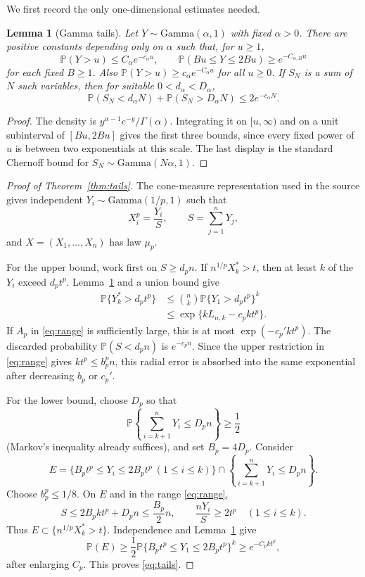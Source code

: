 \documentclass[11pt]{article}
\newtheorem{lemma}[theorem]{Lemma}
\newcommand{\Pp}{\mathbb P}
\begin{document}
We first record the only one-dimensional estimates needed.

\begin{lemma}[Gamma tails]\label{lem:gamma}
Let $Y\sim\mathrm{Gamma}(\alpha,1)$ with fixed $\alpha>0$.  There are positive
constants depending only on $\alpha$ such that, for $u\geq1$,
\[
 \Pp(Y>u)\leq C_\alpha e^{-c_\alpha u},
 \qquad
 \Pp(Bu\leq Y\leq2Bu)\geq e^{-C_{\alpha,B}u}
\]
for each fixed $B\geq1$.  Also
$\Pp(Y>u)\geq c_\alpha e^{-C_\alpha u}$ for all $u\geq0$.
If $S_N$ is a sum of $N$ such variables, then for suitable
$0<d_\alpha<D_\alpha$,
\[
 \Pp(S_N<d_\alpha N)+\Pp(S_N>D_\alpha N)\leq2e^{-c_\alpha N}.
\]
\end{lemma}

\begin{proof}
The density is $y^{\alpha-1}e^{-y}/\Gamma(\alpha)$.  Integrating it on
$[u,\infty)$ and on a unit subinterval of $[Bu,2Bu]$ gives the first three
bounds, since every fixed power of $u$ is between two exponentials at this
scale.  The last display is the standard Chernoff bound for
$S_N\sim\mathrm{Gamma}(N\alpha,1)$.
\end{proof}

\begin{proof}[Proof of Theorem~\ref{thm:tails}]
The cone-measure representation used in the source gives independent
$Y_i\sim\mathrm{Gamma}(1/p,1)$ such that
\begin{equation}\label{eq:representation}
 X_i^p=\frac{Y_i}{S},\qquad S=\sum_{j=1}^nY_j,
\end{equation}
and $X=(X_1,\ldots,X_n)$ has law $\mu_p$.

For the upper bound, work first on $S\geq d_pn$.  If
$n^{1/p}X_k^*>t$, then at least $k$ of the $Y_i$ exceed $d_pt^p$.
Lemma~\ref{lem:gamma} and a union bound give
\begin{align*}
 \Pp\{Y_k^*>d_pt^p\}
 &\leq \binom{n}{k}\Pp\{Y_1>d_pt^p\}^k\\
 &\leq \exp\{kL_{n,k}-c_pkt^p\}.
\end{align*}
If $A_p$ in \eqref{eq:range} is sufficiently large, this is at most
$\exp(-c_p'kt^p)$.  The discarded probability $\Pp(S<d_pn)$ is
$e^{-c_pn}$.  Since the upper restriction in \eqref{eq:range} gives
$kt^p\leq b_p^pn$, this radial error is absorbed into the same exponential
after decreasing $b_p$ or $c_p'$.

For the lower bound, choose $D_p$ so that
\[
 \Pp\left\{\sum_{i=k+1}^nY_i\leq D_pn\right\}\geq\frac12
\]
(Markov's inequality already suffices), and set $B_p=4D_p$.  Consider
\[
 E=\{B_pt^p\leq Y_i\leq2B_pt^p\ (1\leq i\leq k)\}
 \cap\left\{\sum_{i=k+1}^nY_i\leq D_pn\right\}.
\]
Choose $b_p^p\leq1/8$.  On $E$ and in the range \eqref{eq:range},
\[
 S\leq2B_pkt^p+D_pn\leq\frac{B_p}{2}n,
 \qquad
 \frac{nY_i}{S}\geq2t^p\quad(1\leq i\leq k).
\]
Thus $E\subset\{n^{1/p}X_k^*>t\}$.  Independence and
Lemma~\ref{lem:gamma} give
\[
 \Pp(E)\geq\frac12
 \Pp\{B_pt^p\leq Y_1\leq2B_pt^p\}^k
 \geq e^{-C_pkt^p},
\]
after enlarging $C_p$.  This proves \eqref{eq:tails}.
\end{proof}
\end{document}
